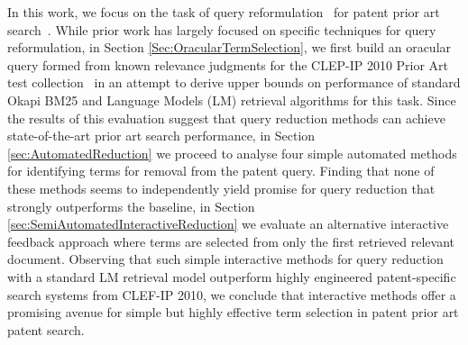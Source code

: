 %
%
In this work, we focus on the task of query
reformulation~\cite{Baeza-Yates2011} for patent prior
art search~\cite{mahdabi2014patent,Piroi2010,xue2009transforming}.  While prior work has largely focused on specific
techniques for query reformulation, in Section \ref{Sec:OracularTermSelection},  we first build an oracular query formed
from known relevance judgments for the CLEP-IP 2010 Prior Art test
collection~\cite{Piroi2010} in an attempt to derive upper
bounds on performance of standard Okapi BM25 and Language Models (LM) retrieval algorithms for
this task.  Since the results of this evaluation suggest that query
reduction methods can achieve state-of-the-art prior art search performance, in Section \ref{sec:AutomatedReduction} we
proceed to analyse four simple automated methods for identifying
terms for removal from the patent query.
Finding that none of these methods
seems to independently yield promise for query reduction that strongly
outperforms the baseline, in Section \ref{sec:SemiAutomatedInteractiveReduction} we evaluate an alternative interactive
feedback approach where terms are selected from only the first
retrieved relevant document.  Observing that such simple interactive
methods for query reduction with a standard LM retrieval model
outperform highly engineered patent-specific search systems from
CLEF-IP 2010, we conclude that interactive methods offer a promising
avenue for simple but highly effective term selection in patent prior
art patent search. 



